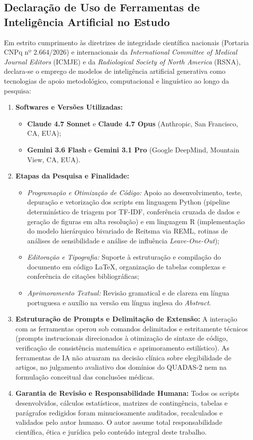 \documentclass[12pt,a4paper]{article}
\begin{document}
\subsection{Declaração de Uso de Ferramentas de Inteligência Artificial no Estudo}
Em estrito cumprimento às diretrizes de integridade científica nacionais (Portaria CNPq nº 2.664/2026) e internacionais da \textit{International Committee of Medical Journal Editors} (ICMJE) e da \textit{Radiological Society of North America} (RSNA), declara-se o emprego de modelos de inteligência artificial generativa como tecnologias de apoio metodológico, computacional e linguístico ao longo da pesquisa:
\begin{enumerate}
    \item \textbf{Softwares e Versões Utilizadas:}
    \begin{itemize}
        \item \textbf{Claude 4.7 Sonnet} e \textbf{Claude 4.7 Opus} (Anthropic, San Francisco, CA, EUA);
        \item \textbf{Gemini 3.6 Flash} e \textbf{Gemini 3.1 Pro} (Google DeepMind, Mountain View, CA, EUA).
    \end{itemize}
    \item \textbf{Etapas da Pesquisa e Finalidade:}
    \begin{itemize}
        \item \textit{Programação e Otimização de Código:} Apoio ao desenvolvimento, teste, depuração e vetorização dos scripts em linguagem Python (pipeline determinístico de triagem por TF-IDF, conferência cruzada de dados e geração de figuras em alta resolução) e em linguagem R (implementação do modelo hierárquico bivariado de Reitsma via REML, rotinas de análises de sensibilidade e análise de influência \textit{Leave-One-Out});
        \item \textit{Editoração e Tipografia:} Suporte à estruturação e compilação do documento em código LaTeX, organização de tabelas complexas e conferência de citações bibliográficas;
        \item \textit{Aprimoramento Textual:} Revisão gramatical e de clareza em língua portuguesa e auxílio na versão em língua inglesa do \textit{Abstract}.
    \end{itemize}
    \item \textbf{Estruturação de Prompts e Delimitação de Extensão:} A interação com as ferramentas operou sob comandos delimitados e estritamente técnicos (prompts instrucionais direcionados à otimização de sintaxe de código, verificação de consistência matemática e aprimoramento estilístico). As ferramentas de IA não atuaram na decisão clínica sobre elegibilidade de artigos, no julgamento avaliativo dos domínios do QUADAS-2 nem na formulação conceitual das conclusões médicas.
    \item \textbf{Garantia de Revisão e Responsabilidade Humana:} Todos os scripts desenvolvidos, cálculos estatísticos, matrizes de contingência, tabelas e parágrafos redigidos foram minuciosamente auditados, recalculados e validados pelo autor humano. O autor assume total responsabilidade científica, ética e jurídica pelo conteúdo integral deste trabalho.
\end{enumerate}
\end{document}
